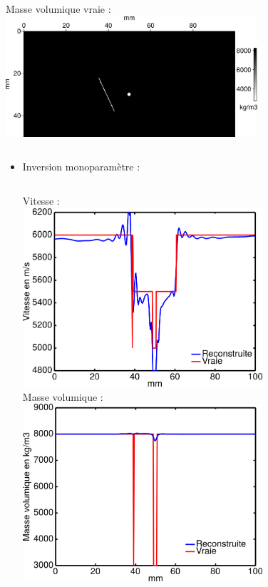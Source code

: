 \documentclass[10pt,xcolor=x11names,compress, notes=show]{beamer}%
\begin{document}
\begin{frame}{\insertsubsectionhead}
\begin{small}
\begin{columns}
		Masse volumique vraie : \\[0.2cm]
		\includegraphics[width=0.7\textwidth]{img/rho_true.png}
	\end{columns}	
	
\end{small}
\end{frame}

\begin{frame}
\begin{itemize}
	\item Inversion monoparamètre : \\[0.2cm]
	\begin{columns}
		\centering
		Vitesse : \\[0.2cm]
		\includegraphics[width=0.7\textwidth]{img/multi/coupe_vp_mono_smooth_hor.png}\\
		\centering
		Masse volumique  : \\[0.2cm]
		\includegraphics[width=0.7\textwidth]{img/multi/coupe_rho_mono.png}\\

\end{columns}
\end{itemize}
\end{frame}
\end{document}
